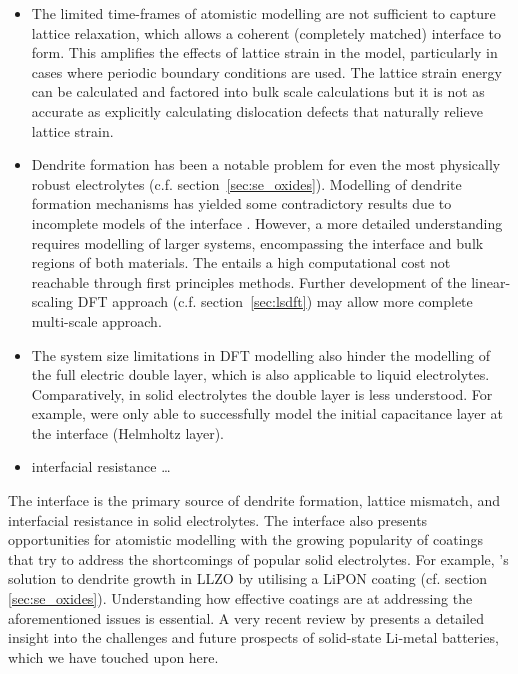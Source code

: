 \documentclass[../main.tex]{subfiles}
\begin{document}
\begin{itemize}
    \item The limited time-frames of atomistic modelling are not sufficient to capture lattice relaxation, which allows a coherent (completely matched) interface to form. This amplifies the effects of lattice strain in the model, particularly in cases where periodic boundary conditions are used. \cite{Lepley2015} The lattice strain energy can be calculated and factored into bulk scale calculations but it is not as accurate as explicitly calculating dislocation defects that naturally relieve lattice strain.\cite{Rodney2017, Clouet2020}
    \item Dendrite formation has been a notable problem for even the most physically robust electrolytes (c.f. section~\ref{sec:se_oxides}). Modelling of dendrite formation mechanisms has yielded some contradictory results due to incomplete models of the interface \cite{Tian2018, Gao2020, Canepa2018}. However, a more detailed understanding requires modelling of larger systems, encompassing the interface and bulk regions of both materials. The entails a high computational cost not reachable through first principles methods. Further development of the linear-scaling DFT approach (c.f. section~\ref{sec:lsdft}) may allow more complete multi-scale approach.
    \item The system size limitations in DFT modelling also hinder the modelling of the full electric double layer, which is also applicable to liquid electrolytes. Comparatively, in solid electrolytes the double layer is less understood. For example, \citeauthor{Tateyama2019} were only able to successfully model the initial capacitance layer at the interface (Helmholtz layer).\cite{Tateyama2019}
    \item interfacial resistance \dots
\end{itemize}

The interface is the primary source of dendrite formation, lattice mismatch, and interfacial resistance in solid electrolytes. The interface also presents opportunities for atomistic modelling with the growing popularity of coatings that try to address the shortcomings of popular solid electrolytes.\cite{Kim2020, Xu2018exp, Chen2020se_coat, Ito2017, Yin2020, Ji2020coating, Li2020coating, Yi2021coating, Dai2021coating, Pan2020coating, Jing2020coating, Wang2021coating, Zhao2020coating, Zhao2021coating, Liang2020coating, Zhang2020coating} For example, \citeauthor{Tian2018}'s solution to dendrite growth in LLZO by utilising a LiPON coating\cite{Tian2018} (cf. section \ref{sec:se_oxides}). Understanding how effective coatings are at addressing the aforementioned issues is essential. \cite{Zhang2020directvis, Xiao2019coat, Tian2018} A very recent review by \citeauthor{kim2021solid} presents a detailed insight into the challenges and future prospects of solid-state Li-metal batteries, which we have touched upon here.\cite{kim2021solid}
\end{document}
